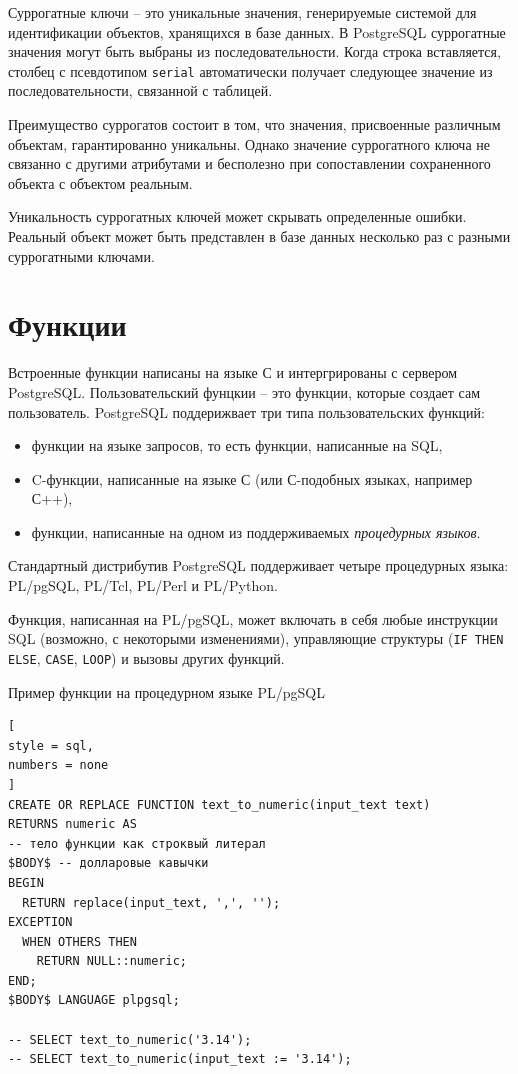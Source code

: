 \documentclass[%
	11pt,
	a4paper,
	utf8,
		]{article}
\begin{document}
Суррогатные ключи -- это уникальные значения, генерируемые системой для идентификации объектов, хранящихся в базе данных. В PostgreSQL суррогатные значения могут быть выбраны из последовательности. Когда строка вставляется, столбец с псевдотипом \verb|serial| автоматически получает следующее значение из последовательности, связанной с таблицей.

Преимущество суррогатов состоит в том, что значения, присвоенные различным объектам, гарантированно уникальны. Однако значение суррогатного ключа не связанно с другими атрибутами и бесполезно при сопоставлении сохраненного объекта с объектом реальным.

Уникальность суррогатных ключей может скрывать определенные ошибки. Реальный объект может быть представлен в базе данных несколько раз с разными суррогатными ключами.

\section{Функции}

Встроенные функции написаны на языке С и интергрированы с сервером PostgreSQL. Пользовательский фунцкии -- это функции, которые создает сам пользователь. PostgreSQL поддерижвает три типа пользовательских функций:
\begin{itemize}
	\item функции на языке запросов, то есть функции, написанные на SQL,
	
	\item C-функции, написанные на языке С (или С-подобных языках, например С++),
	
	\item функции, написанные на одном из поддерживаемых \emph{процедурных языков}.
\end{itemize}

Стандартный дистрибутив PostgreSQL поддерживает четыре процедурных языка: PL/pgSQL, PL/Tcl, PL/Perl и PL/Python.

Функция, написанная на PL/pgSQL, может включать в себя любые инструкции SQL (возможно, с некоторыми изменениями), управляющие структуры (\verb|IF THEN ELSE|, \verb|CASE|, \verb|LOOP|) и вызовы других функций.

Пример функции на процедурном языке PL/pgSQL
\begin{lstlisting}[
style = sql,
numbers = none	
]
CREATE OR REPLACE FUNCTION text_to_numeric(input_text text)
RETURNS numeric AS
-- тело функции как строквый литерал
$BODY$ -- долларовые кавычки
BEGIN
  RETURN replace(input_text, ',', '');
EXCEPTION
  WHEN OTHERS THEN
    RETURN NULL::numeric;
END;
$BODY$ LANGUAGE plpgsql;

-- SELECT text_to_numeric('3.14'); 
-- SELECT text_to_numeric(input_text := '3.14');
\end{lstlisting}
\end{document}
